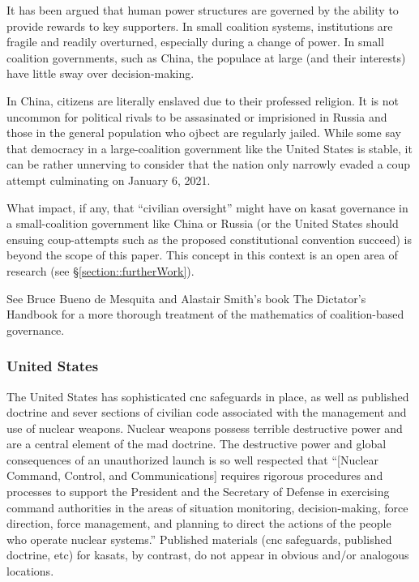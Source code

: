 It has been argued that human power structures are governed by the
ability to provide rewards to key supporters.\cite[ch1]{dictator} In
small coalition systems, institutions are fragile and readily
overturned, especially during a change of power.\cite[ch2]{dictator}
In small coalition governments, such as China, the populace at large
(and their interests) have little sway over
decision-making.\cite[ch1]{dictator}

In China, citizens are literally enslaved due to their professed
religion.\cite[ouigers]{xxx} It is not uncommon for political rivals
to be assasinated\cite[polonium]{xxx} or
imprisioned\cite[navalny]{xxx} in Russia and those in the general
population who ojbect are regularly jailed.\cite[protestors
  jailed]{xxx} While some say that democracy in a large-coalition
government like the United States is stable\cite[chXXX]{dictator}, it
can be rather unnerving to consider that the nation only narrowly
evaded a coup attempt culminating on January 6, 2021.\cite[summary of
  coup attempt]{xxx}

What impact, if any, that ``civilian oversight'' might have on
\ac{kasat} governance in a small-coalition government like China or
Russia (or the United States should ensuing coup-attempts such as the
proposed constitutional convention succeed) is beyond the scope of
this paper.  This concept in this context is an open area of research
(see \S\ref{section::furtherWork}).

See Bruce Bueno de Mesquita and Alastair Smith's book
\cite{https://www.publicaffairsbooks.com/titles/bruce-bueno-de-mesquita/the-dictators-handbook/9781541701366/}{The
  Dictator's Handbook} for a more thorough treatment of the
mathematics of coalition-based governance.


\subsubsection{United States}

The United States has sophisticated \ac{cnc} safeguards in place, as
well as published doctrine and sever sections of civilian code
associated with the management and use of nuclear weapons.\cite[the
  right joint publication]{xxx} Nuclear weapons possess terrible
destructive power and are a central element of the \acf{mad}
doctrine.\cite[mad overview]{xxx} The destructive power and global
consequences of an unauthorized launch is so well respected that
``[Nuclear Command, Control, and Communications] requires rigorous
procedures and processes to support the President and the Secretary of
Defense in exercising command authorities in the areas of situation
monitoring, decision-making, force direction, force management, and
planning to direct the actions of the people who operate nuclear
systems.''\cite{nuke-matters-handbook} Published materials (\ac{cnc}
safeguards, published doctrine, etc) for \acp{kasat}, by contrast, do
not appear in obvious and/or analogous locations.

